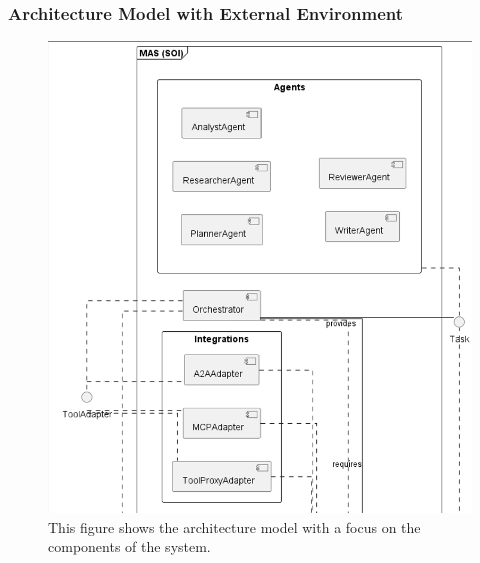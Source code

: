 \subsubsection*{Architecture Model with External Environment}
\begin{figure}[htbp]
  \centering
  \includegraphics[width=\linewidth]{ressources/MAS/diagrams/MAS_arch_and_environment1.png}
  \caption{This figure shows the architecture model with a focus on the components of the system.}
  \label{fig:app-mas-arch-mod}
\end{figure}

\clearpage
